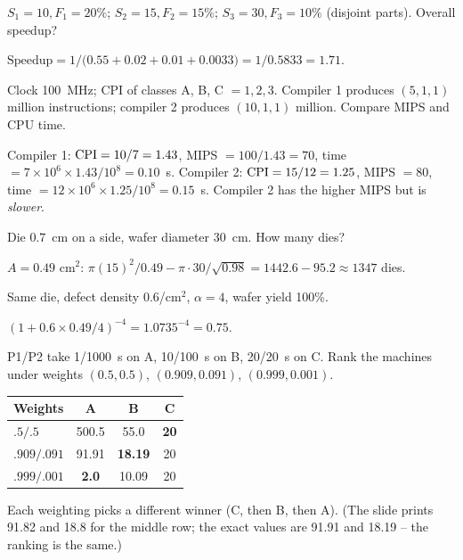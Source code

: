 \documentclass[11pt]{article}
\begin{document}
\begin{exercise}
$S_1=10, F_1=20\%$; $S_2=15, F_2=15\%$; $S_3=30, F_3=10\%$ (disjoint
parts). Overall speedup?
\end{exercise}
\begin{solution}
$\text{Speedup} = 1/\big(0.55 + 0.02 + 0.01 + 0.0033\big) = 1/0.5833 =
1.71$.
\end{solution}

\begin{exercise}
Clock 100~MHz; CPI of classes A, B, C $=1,2,3$. Compiler 1 produces
$(5,1,1)$ million instructions; compiler 2 produces $(10,1,1)$ million.
Compare MIPS and CPU time.
\end{exercise}
\begin{solution}
Compiler 1: $\mathrm{CPI} = 10/7 = 1.43$, MIPS $=100/1.43 = 70$, time
$=7\times10^6\times1.43/10^8 = 0.10$~s.
Compiler 2: $\mathrm{CPI} = 15/12 = 1.25$, MIPS $= 80$, time
$=12\times10^6\times1.25/10^8 = 0.15$~s.
Compiler 2 has the higher MIPS but is \emph{slower}.
\end{solution}

\begin{exercise}
Die $0.7$~cm on a side, wafer diameter 30~cm. How many dies?
\end{exercise}
\begin{solution}
$A=0.49\text{ cm}^2$:
$\pi(15)^2/0.49 - \pi\cdot30/\sqrt{0.98} = 1442.6 - 95.2 \approx 1347$ dies.
\end{solution}

\begin{exercise}
Same die, defect density $0.6$/cm$^2$, $\alpha=4$, wafer yield 100\%.
\end{exercise}
\begin{solution}
$(1 + 0.6\times0.49/4)^{-4} = 1.0735^{-4} = 0.75$.
\end{solution}

\begin{exercise}
P1/P2 take 1/1000~s on A, 10/100~s on B, 20/20~s on C. Rank the machines
under weights $(0.5,0.5)$, $(0.909,0.091)$, $(0.999,0.001)$.
\end{exercise}
\begin{solution}
\begin{tabular}[t]{@{}lccc@{}}
Weights & A & B & C \\
\hline
$.5/.5$     & 500.5 & 55.0  & \textbf{20} \\
$.909/.091$ & 91.91 & \textbf{18.19} & 20 \\
$.999/.001$ & \textbf{2.0} & 10.09 & 20 \\
\end{tabular}

Each weighting picks a different winner (C, then B, then A). (The slide
prints 91.82 and 18.8 for the middle row; the exact values are 91.91 and
18.19 -- the ranking is the same.)
\end{solution}
\end{document}
